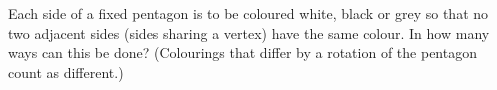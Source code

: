 Each side of a fixed pentagon is to be coloured white, black or grey so that no two adjacent sides (sides sharing a vertex) have the same colour. In how many ways can this be done? (Colourings that differ by a rotation of the pentagon count as different.)
